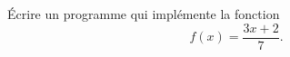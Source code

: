 
\begin{exercice}\label{exosmath-0003}

    Écrire un programme qui implémente la fonction
    \begin{equation}
        f(x)=\frac{ 3x+2 }{ 7 }.
    \end{equation}
    

\end{exercice}
